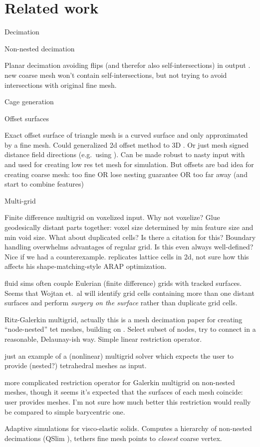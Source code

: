 \section{Related work}
\label{sec:related}

Decimation

Non-nested decimation \cite{Garland:1997:SSU}

Planar decimation avoiding flips (and therefor also self-intersections) in
output \cite{AnderssonGL09}.  \cite{gumhold2003intersection} new coarse mesh
won't contain self-intersections, but not trying to avoid intersections with
original fine mesh.

Cage generation

\cite{Deng:2011vr,Xian:2012tv}

Offset surfaces 

\cite{Campen:2010} Exact offset surface of triangle mesh is a curved surface
and only approximated by a fine mesh.  Could generalized 2d offset method
\cite{chen2005polygon} to 3D \cite{Jacobson:WN:2013}.  Or just mesh signed
distance field directions (e.g.\ using \cite{cgal}). Can be made robust to
nasty input with \cite{Xu:2014:SDF} and used for creating low res tet mesh for
simulation.
%
But offsets are bad idea for creating coarse mesh: too fine OR lose nesting
guarantee OR too far away (and start to combine features)

Multi-grid 

\cite{McAdams:2011} Finite difference multigrid on voxelized input. Why not
voxelize? Glue geodesically distant parts together: voxel size determined by
min feature size and min void size. What about duplicated cells? Is there a
citation for this? Boundary handling overwhelms advantages of regular grid. Is
this even always well-defined? Nice if we had a counterexample.
\cite{Sykora09} replicates lattice cells in 2d, not sure how this affects his
shape-matching-style ARAP optimization.

\cite{wojtan2011liquid} fluid sims often couple Eulerian (finite difference)
grids with tracked surfaces. Seems that Wojtan et.\ al will identify grid cells
containing more than one distant surfaces and perform \emph{surgery on the
surface} rather than duplicate grid cells.

\cite{Adams:1999:PMS} Ritz-Galerkin multigrid, actually this is a mesh
decimation paper for creating ``node-nested'' tet meshes, building on
\cite{guillard1993}. Select subset of nodes, try to connect in a reasonable,
Delaunay-ish way. Simple linear restriction operator.

\cite{fish1995efficient} just an example of a (nonlinear) multigrid solver
which expects the user to provide (nested?) tetrahedral meshes as input.

\cite{feng1997non} more complicated restriction operator for Galerkin multigrid
on non-nested meshes, though it seems it's expected that the surfaces of each
mesh coincide: user provides meshes. I'm not sure how much better this
restriction would really be compared to simple barycentric one.

\cite{Debunne:2001:DRD} 
Adaptive simulations for visco-elastic solids. Computes a hierarchy of
non-nested decimations (QSlim \cite{Garland:1997:SSU}), tethers fine mesh
points to \emph{closest} coarse vertex.
